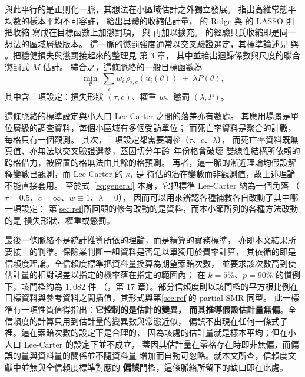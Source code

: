 與此平行的是正則化一脈，其想法在小區域估計之外獨立發展。
\citet{stein1956} 指出高維常態平均數的樣本平均不可容許，
\citet{james1961} 給出具體的收縮估計量，
\citet{hoerl1970} 的 Ridge 與 \citet{tibshirani1996} 的 LASSO 則把收縮
寫成在目標函數上加懲罰項，\citet{zou2005} 與 \citet{zou2006} 再加以擴充。
\citet{fay1979} 的經驗貝氏收縮即是同一想法的區域層級版本。
這一脈的懲罰強度通常以交叉驗證選定，其標準論述見 \citet{buhlmann2011} 與
\citet{hastie2015}。把穩健損失與懲罰接起來的整理見 \citet{zoubir2018} 第 3 章，
其中並給出迴歸係數與尺度的聯合懲罰式 $M$-估計。
綜合之，這條脈絡的一般目標函數為
\begin{equation}\label{eq:general}
\min_{\theta}\ \sum_{i} w_i\,\rho_{\tau,c}(u_i(\theta))\;+\;\lambda P(\theta),
\end{equation}
其中含三項設定：損失形狀 $(\tau,c)$、權重 $w$、懲罰 $(\lambda,P)$。

這條脈絡的標準設定與小人口 Lee-Carter 之間的落差亦有數處。
其應用場景是單位層級的調查資料，每個小區域有多個受訪單位；
而死亡率資料是聚合的計數，每格只有一個觀測。
其次，三項設定都需要調參（$\tau$、$c$、$\lambda$），
而死亡率資料既無真值、亦無法以交叉驗證選參，蓋因切分年齡--年份格會破壞
雙線性結構所依賴的跨格借力，被留置的格無法由其餘的格預測。
再者，這一脈的漸近理論均假設解釋變數已觀測，而 Lee-Carter 的 $\kappa_t$ 是
待估的潛在變數而非觀測值，故上述理論不能直接套用。
至於式~\eqref{eq:general} 本身，它把標準 Lee-Carter 納為一個角落
（$\tau=0.5$、$c=\infty$、$w\equiv1$、$\lambda=0$），
因而可以用來辨認各種補救各自改動了其中哪一項設定：
第\ref{sec:ref}所回顧的修勻改動的是資料，而本小節所列的各種方法改動的是
損失形狀、權重或懲罰。

最後一條脈絡不是統計推導所依的理論，而是精算的實務標準，
亦即本文結果所要接上的判準。保險業判斷一組資料是否足以單獨用於費率計算，
其依循的即是信賴度理論。全信賴度標準把資料量換算為期望索賠次數，
並要求該次數高到使估計量的相對誤差以指定的機率落在指定的範圍內；
在 $k=5\%$、$p=90\%$ 的慣例下，該門檻約為 $1{,}082$ 件
（\citealp{klugman2012}，第 17 章）。部分信賴度則以該門檻的平方根比例在
目標資料與參考資料之間插值，其形式與第\ref{sec:ref}的 partial SMR 同型。
此一標準有一項性質值得指出：\textbf{它控制的是估計的變異，
而其推導假設估計量無偏}。全信賴度的計算只用到估計量的變異數與常態近似，
偏誤不出現在任何一條式子裡。這在索賠次數的設定下是合理的，
因為該處的估計量就是樣本平均；但在小人口 Lee-Carter 的設定下並不成立，
蓋因其估計量在零格存在時即非無偏，而偏誤的量與資料量的關係並不隨資料量
增加而自動可忽略。就本文所查，信賴度文獻中並無與全信賴度標準對應的
\textbf{偏誤}門檻，這條脈絡所留下的缺口即在此處。
